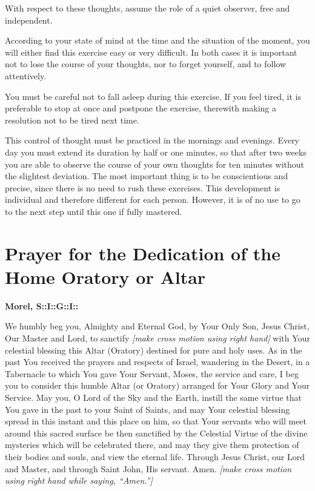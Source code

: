 \documentclass{article}
\begin{document}
With respect to these thoughts, assume the role of a quiet observer, free and independent.

According to your state of mind at the time and the situation of the moment, you will either find
this exercise easy or very difficult. In both cases it is important not to lose the course of your
thoughts, nor to forget yourself, and to follow attentively.

You must be careful not to fall asleep during this exercise. If you feel tired, it is preferable to
stop at once and postpone the exercise, therewith making a resolution not to be tired next time.

This control of thought must be practiced in the mornings and evenings. Every day you must
extend its duration by half or one minutes, so that after two weeks you are able to observe the
course of your own thoughts for ten minutes without the slightest deviation. The most important
thing is to be conscientious and precise, since there is no need to rush these exercises. This
development is individual and therefore different for each person. However, it is of no use to go
to the next step until this one if fully mastered. 

\section*{Prayer for the Dedication of the Home Oratory or Altar}
{\large\textbf{Morel, S::I::G::I::}}

We humbly beg you, Almighty and Eternal God, by Your Only Son, Jesus Christ, Our Master and
Lord, to sanctify \textit{[make cross motion using right hand]} with Your celestial blessing this Altar (Oratory) destined for pure and holy uses.
As in the past You received the prayers and respects of Israel, wandering in the Desert, in a
Tabernacle to which You gave Your Servant, Moses, the service and care, I beg you to consider
this humble Altar (or Oratory) arranged for Your Glory and Your Service. May you, O Lord of the
Sky and the Earth, instill the same virtue that You gave in the past to your Saint of Saints, and
may Your celestial blessing spread in this instant and this place on him, so that Your servants who
will meet around this sacred surface be then sanctified by the Celestial Virtue of the divine
mysteries which will be celebrated there, and may they give them protection of their bodies and
souls, and view the eternal life. Through Jesus Christ, our Lord and Master, and through Saint
John, His servant. Amen. \textit{[make cross motion using right hand while saying, ``Amen.'']}
\end{document}
